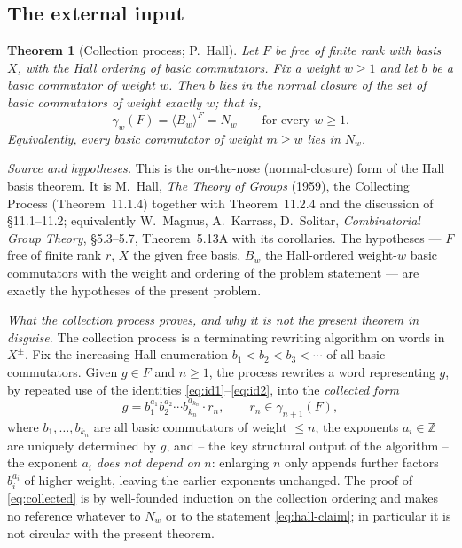 \documentclass{amsart}
\newtheorem{theorem}{Theorem}
\theoremstyle{definition}
\theoremstyle{remark}
\begin{document}
\subsection{The external input}

\begin{theorem}[Collection process; P.~Hall]\label{thm:hall-full}
Let $F$ be free of finite rank with basis $X$, with the Hall ordering of basic
commutators. Fix a weight $w\ge1$ and let $b$ be a basic commutator of weight $w$.
Then $b$ lies in the normal closure of the set of basic commutators of weight
exactly $w$; that is,
\begin{equation}\label{eq:hall-claim}
\gamma_w(F)=\langle B_w\rangle^{F}=N_w\qquad\text{for every }w\ge1 .
\end{equation}
Equivalently, every basic commutator of weight $m\ge w$ lies in $N_w$.
\end{theorem}

\noindent
\emph{Source and hypotheses.} This is the on-the-nose (normal-closure) form of the
Hall basis theorem. It is M.\ Hall, \emph{The Theory of Groups} (1959), the
Collecting Process (Theorem~11.1.4) together with Theorem~11.2.4 and the
discussion of \S11.1--11.2; equivalently W.\ Magnus, A.\ Karrass, D.\ Solitar,
\emph{Combinatorial Group Theory}, \S5.3--5.7, Theorem~5.13A with its corollaries.
The hypotheses --- $F$ free of finite rank $r$, $X$ the given free basis, $B_w$ the
Hall-ordered weight-$w$ basic commutators with the weight and ordering of the
problem statement --- are exactly the hypotheses of the present problem.

\smallskip
\emph{What the collection process proves, and why it is not the present theorem in
disguise.} The collection process is a terminating rewriting algorithm on words in
$X^{\pm}$. Fix the increasing Hall enumeration $b_1<b_2<b_3<\cdots$ of all basic
commutators. Given $g\in F$ and $n\ge1$, the process rewrites a word representing
$g$, by repeated use of the identities \eqref{eq:id1}--\eqref{eq:id2}, into the
\emph{collected form}
\begin{equation}\label{eq:collected}
g=b_1^{a_1}b_2^{a_2}\cdots b_{k_n}^{a_{k_n}}\cdot r_n,
\qquad r_n\in\gamma_{n+1}(F),
\end{equation}
where $b_1,\dots,b_{k_n}$ are all basic commutators of weight $\le n$, the
exponents $a_i\in\mathbb Z$ are uniquely determined by $g$, and -- the key
structural output of the algorithm -- the exponent $a_i$ \emph{does not depend on}
$n$: enlarging $n$ only appends further factors $b_i^{a_i}$ of higher weight,
leaving the earlier exponents unchanged. The proof of \eqref{eq:collected} is by
well-founded induction on the collection ordering and makes no reference whatever
to $N_w$ or to the statement \eqref{eq:hall-claim}; in particular it is not
circular with the present theorem.
\end{document}

